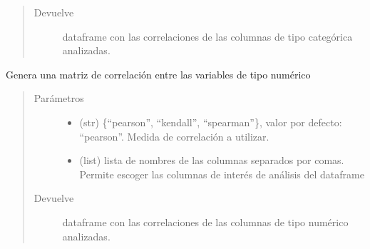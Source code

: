 \documentclass[letterpaper,10pt,openany,spanish]{sphinxmanual}
\begin{document}
\begin{fulllineitems}
\begin{fulllineitems}
\begin{quote}
\begin{description}
\item[{Devuelve}] \leavevmode
dataframe con las correlaciones de las columnas de tipo             categórica analizadas.

\end{description}\end{quote}

\end{fulllineitems}


\begin{fulllineitems}
\label{\detokenize{calidad_datos:calidad_datos.CalidadDatos.CorrelacionNumericas}}
Genera una matriz de correlación entre las variables de tipo numérico
\begin{quote}\begin{description}
\item[{Parámetros}] \leavevmode\begin{itemize}
\item {} 
 \textendash{} (str) \{“pearson”, “kendall”, “spearman”\}, valor por             defecto: “pearson”. Medida de correlación a utilizar.

\item {} 
 \textendash{} (list) lista de nombres de las columnas separados             por comas. Permite escoger las columnas de interés de análisis             del dataframe

\end{itemize}

\item[{Devuelve}] \leavevmode
dataframe con las correlaciones de las columnas de tipo             numérico analizadas.

\end{description}\end{quote}

\end{fulllineitems}



\end{fulllineitems}
\end{document}
